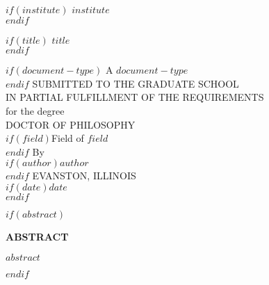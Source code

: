 \doublespacing

\newcommand{\formattitlespace}{0.6in}

\begin{titlepage}\begin{center}\begin{singlespacing}
\vspace{5\baselineskip}   
$if(institute)$
\MakeUppercase{$institute$}\\
$endif$
\vspace{\formattitlespace}

$if(title)$
$title$\\
$endif$
\vspace{\formattitlespace}

$if(document-type)$
A \MakeUppercase{$document-type$}\\
\vspace{\formattitlespace}
$endif$
SUBMITTED TO THE GRADUATE SCHOOL\\
IN PARTIAL FULFILLMENT OF THE REQUIREMENTS\\
\vspace{\formattitlespace}
for the degree\\
\vspace{\formattitlespace}
DOCTOR OF PHILOSOPHY\\
\vspace{\formattitlespace}
$if(field)$Field of $field$\\$endif$
\vspace{\formattitlespace}
By\\
\vspace{1\baselineskip}
$if(author)$$author$\\$endif$
\vspace{\formattitlespace}
EVANSTON, ILLINOIS\\
\vspace{\formattitlespace}
$if(date)$$date$\\$endif$
\vspace{\formattitlespace}
\vfill

\end{singlespacing}\end{center}\end{titlepage}

$if(abstract)$
\clearpage
\begin{centering}
\textbf{ABSTRACT}\\
\vspace{\baselineskip}
\end{centering}
\begin{doublespacing}
$abstract$
\end{doublespacing}
$endif$


